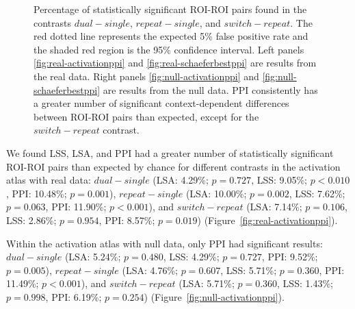 \documentclass[phd,appendix,figures]{uithesis}
\begin{document}
\begin{figure}[H]
  \centering
  \hfill
  \vfill
  \hfill
  \caption[Comparison of LSA/LSS/PPI using participant data]{
    Percentage of statistically significant ROI-ROI pairs found
    in the contrasts $dual - single$, $repeat - single$, and
    $switch - repeat$.
    The red dotted line represents the expected 5\% false positive rate
    and the shaded red region is the 95\% confidence interval.
    Left panels \ref{fig:real-activationppi} and \ref{fig:real-schaeferbestppi}
    are results from the real data.
    Right panels \ref{fig:null-activationppi} and \ref{fig:null-schaeferbestppi} are results
    from the null data.
    PPI consistently has a greater number of significant context-dependent differences between ROI-ROI pairs
    than expected, except for the $switch - repeat$ contrast.
  }
\label{fig:main-resultppi}
\end{figure}

We found LSS, LSA, and PPI had a greater number of statistically significant ROI-ROI pairs than expected by chance
for different contrasts in the activation atlas with real data: $dual - single$ (LSA: 4.29\%; $p = 0.727$,
LSS: 9.05\%; $p < 0.010$, PPI: 10.48\%; $p = 0.001$),
$repeat - single$ (LSA: 10.00\%; $p = 0.002$, LSS: 7.62\%; $p = 0.063$, PPI: 11.90\%; $p < 0.001$), and
$switch - repeat$ (LSA: 7.14\%; $p = 0.106$, LSS: 2.86\%; $p = 0.954$, PPI: 8.57\%; $p = 0.019$) (Figure~\ref{fig:real-activationppi}).

Within the activation atlas with null data, only PPI had significant results:
$dual - single$ (LSA: 5.24\%; $p = 0.480$, LSS: 4.29\%; $p = 0.727$, PPI: 9.52\%; $p = 0.005$),
$repeat - single$ (LSA: 4.76\%; $p = 0.607$, LSS: 5.71\%; $p = 0.360$, PPI: 11.49\%; $p < 0.001$), and
$switch - repeat$ (LSA: 5.71\%; $p = 0.360$, LSS: 1.43\%; $p = 0.998$, PPI: 6.19\%; $p = 0.254$) (Figure~\ref{fig:null-activationppi}).
\end{document}
